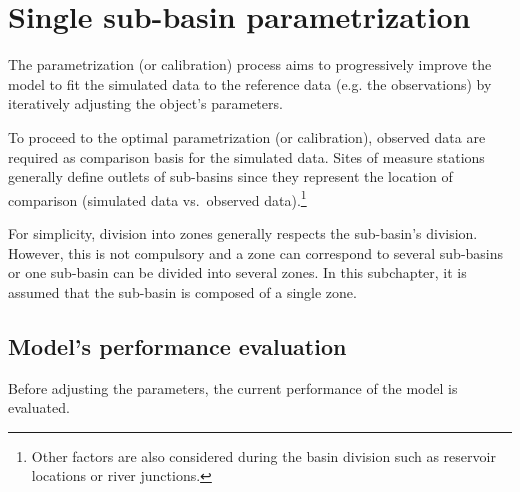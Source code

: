 \documentclass[
  letterpaper,
  DIV=11,
  numbers=noendperiod]{scrreprt}
\begin{document}
\hypertarget{sec-user_rainfall_runoff_subbasin_param}{%
\chapter{Single sub-basin
parametrization}\label{sec-user_rainfall_runoff_subbasin_param}}

The parametrization (or calibration) process aims to progressively
improve the model to fit the simulated data to the reference data (e.g.
the observations) by iteratively adjusting the object's parameters.

To proceed to the optimal parametrization (or calibration), observed
data are required as comparison basis for the simulated data. Sites of
measure stations generally define outlets of sub-basins since they
represent the location of comparison (simulated data vs.~observed
data).\footnote{Other factors are also considered during the basin
  division such as reservoir locations or river junctions.}

For simplicity, division into zones generally respects the sub-basin's
division. However, this is not compulsory and a zone can correspond to
several sub-basins or one sub-basin can be divided into several zones.
In this subchapter, it is assumed that the sub-basin is composed of a
single zone.

\hypertarget{sec-user_rainfall_runoff_model_performance}{%
\section{Model's performance
evaluation}\label{sec-user_rainfall_runoff_model_performance}}

Before adjusting the parameters, the current performance of the model is
evaluated.
\end{document}
